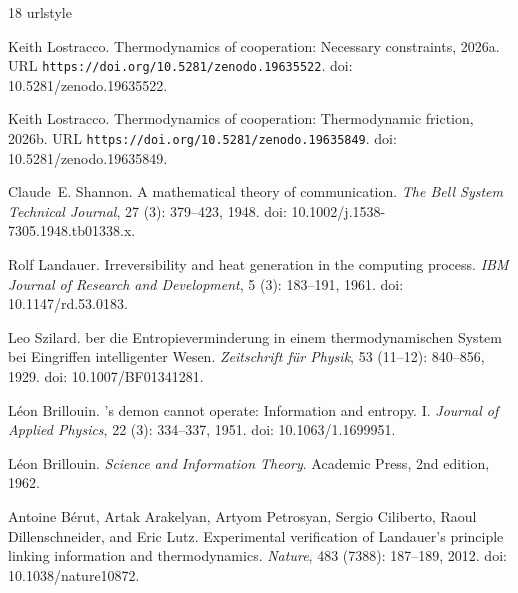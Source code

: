 \documentclass[11pt]{article}
\theoremstyle{plain}
\theoremstyle{definition}
\theoremstyle{remark}
\begin{document}
\begin{thebibliography}{18}
\providecommand{\natexlab}[1]{#1}
\providecommand{\url}[1]{\texttt{#1}}
\expandafter\ifx\csname urlstyle\endcsname\relax
  \providecommand{\doi}[1]{doi: #1}\else
  \providecommand{\doi}{doi: \begingroup \urlstyle{rm}\Url}\fi

\bibitem[Lostracco(2026{\natexlab{a}})]{TC-I}
Keith Lostracco.
\newblock Thermodynamics of cooperation: Necessary constraints,
  2026{\natexlab{a}}.
\newblock URL \url{https://doi.org/10.5281/zenodo.19635522}.
\newblock \doi{10.5281/zenodo.19635522}.

\bibitem[Lostracco(2026{\natexlab{b}})]{TC-IV}
Keith Lostracco.
\newblock Thermodynamics of cooperation: Thermodynamic friction,
  2026{\natexlab{b}}.
\newblock URL \url{https://doi.org/10.5281/zenodo.19635849}.
\newblock \doi{10.5281/zenodo.19635849}.

Claude~E. Shannon.
\newblock A mathematical theory of communication.
\newblock \emph{The Bell System Technical Journal}, 27 (3):
  379--423, 1948.
\newblock \doi{10.1002/j.1538-7305.1948.tb01338.x}.

Rolf Landauer.
\newblock Irreversibility and heat generation in the computing process.
\newblock \emph{IBM Journal of Research and Development}, 5
  (3): 183--191, 1961.
\newblock \doi{10.1147/rd.53.0183}.

Leo Szilard.
ber die {Entropieverminderung} in einem thermodynamischen
  {System} bei {Eingriffen} intelligenter {Wesen}.
\newblock \emph{Zeitschrift f{\"u}r Physik}, 53 (11--12):
  840--856, 1929.
\newblock \doi{10.1007/BF01341281}.

L{\'e}on Brillouin.
's demon cannot operate: Information and entropy. {I}.
\newblock \emph{Journal of Applied Physics}, 22 (3):
  334--337, 1951.
\newblock \doi{10.1063/1.1699951}.

L{\'e}on Brillouin.
\newblock \emph{Science and Information Theory}.
\newblock Academic Press, 2nd edition, 1962.

Antoine B{\'e}rut, Artak Arakelyan, Artyom Petrosyan, Sergio Ciliberto, Raoul
  Dillenschneider, and Eric Lutz.
\newblock Experimental verification of {Landauer}'s principle linking
  information and thermodynamics.
\newblock \emph{Nature}, 483 (7388): 187--189, 2012.
\newblock \doi{10.1038/nature10872}.


\end{thebibliography}
\end{document}
